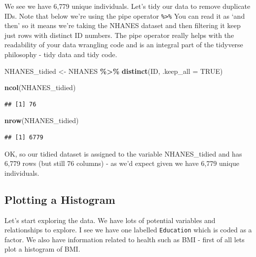\documentclass[
]{book}
\newenvironment{Shaded}{\begin{snugshade}}{\end{snugshade}}
\newcommand{\AttributeTok}[1]{\textcolor[rgb]{0.13,0.29,0.53}{#1}}
\newcommand{\ConstantTok}[1]{\textcolor[rgb]{0.56,0.35,0.01}{#1}}
\newcommand{\FunctionTok}[1]{\textcolor[rgb]{0.13,0.29,0.53}{\textbf{#1}}}
\newcommand{\NormalTok}[1]{#1}
\newcommand{\OtherTok}[1]{\textcolor[rgb]{0.56,0.35,0.01}{#1}}
\newcommand{\SpecialCharTok}[1]{\textcolor[rgb]{0.81,0.36,0.00}{\textbf{#1}}}
\begin{document}
We see we have 6,779 unique individuals. Let's tidy our data to remove duplicate IDs. Note that below we're using the pipe operator \texttt{\%\textgreater{}\%} You can read it as `and then' so it means we're taking the NHANES dataset and then filtering it keep just rows with distinct ID numbers. The pipe operator really helps with the readability of your data wrangling code and is an integral part of the tidyverse philosophy - tidy data and tidy code.

\begin{Shaded}
\begin{Highlighting}[]
\NormalTok{NHANES\_tidied }\OtherTok{\textless{}{-}}\NormalTok{ NHANES }\SpecialCharTok{\%\textgreater{}\%} 
  \FunctionTok{distinct}\NormalTok{(ID, }\AttributeTok{.keep\_all =} \ConstantTok{TRUE}\NormalTok{)}
\end{Highlighting}
\end{Shaded}

\begin{Shaded}
\begin{Highlighting}[]
\FunctionTok{ncol}\NormalTok{(NHANES\_tidied)}
\end{Highlighting}
\end{Shaded}

\begin{verbatim}
## [1] 76
\end{verbatim}

\begin{Shaded}
\begin{Highlighting}[]
\FunctionTok{nrow}\NormalTok{(NHANES\_tidied)}
\end{Highlighting}
\end{Shaded}

\begin{verbatim}
## [1] 6779
\end{verbatim}

OK, so our tidied dataset is assigned to the variable NHANES\_tidied and has 6,779 rows (but still 76 columns) - as we'd expect given we have 6,779 unique individuals.

\hypertarget{plotting-a-histogram}{%
\subsection{Plotting a Histogram}\label{plotting-a-histogram}}

Let's start exploring the data. We have lots of potential variables and relationships to explore. I see we have one labelled \texttt{Education} which is coded as a factor. We also have information related to health such as BMI - first of all lets plot a histogram of BMI.
\end{document}
